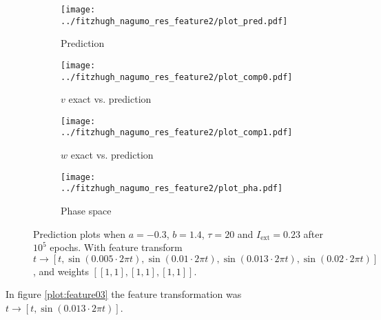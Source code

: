 \documentclass[a4paper]{article}
\begin{document}
\begin{figure}[H]
	\centering 
	\begin{subfigure}[b]{0.47\textwidth}
		\centering
		\texttt{[image: ../fitzhugh\_nagumo\_res\_feature2/plot\_pred.pdf]}
		\caption{Prediction}
		\label{fig:feature02a}
	\end{subfigure}
	\begin{subfigure}[b]{0.47\textwidth}
		\centering
		\texttt{[image: ../fitzhugh\_nagumo\_res\_feature2/plot\_comp0.pdf]}
		\caption{$v$ exact vs. prediction}
		\label{fig:feature02b}
	\end{subfigure}
	\begin{subfigure}[b]{0.47\textwidth}
		\centering
		\texttt{[image: ../fitzhugh\_nagumo\_res\_feature2/plot\_comp1.pdf]}
		\caption{$w$ exact vs. prediction}
		\label{fig:feature02c}
	\end{subfigure}
	\begin{subfigure}[b]{0.47\textwidth}
		\centering
		\texttt{[image: ../fitzhugh\_nagumo\_res\_feature2/plot\_pha.pdf]}
		\caption{Phase space}
		\label{fig:feature02d}
	\end{subfigure}
	\caption{Prediction plots when $a=-0.3$, $b=1.4$, $\tau=20$ and $ I_{\text{ext}}=0.23$ after $10^5$ epochs. With feature transform $t \rightarrow \left[  t, \sin(0.005\cdot 2 \pi t), \sin(0.01\cdot 2 \pi t), \sin(0.013\cdot 2 \pi t), \sin(0.02\cdot 2 \pi t) \right]$, and weights $\left[ \left[ 1, 1\right], \left[ 1, 1\right], \left[ 1, 1\right]\right]$.}
	\label{plot:feature02}
\end{figure} 	


In figure \ref{plot:feature03} the feature transformation was $t \rightarrow \left[t, \sin(0.013\cdot 2 \pi t) \right]$. 
\end{document}
